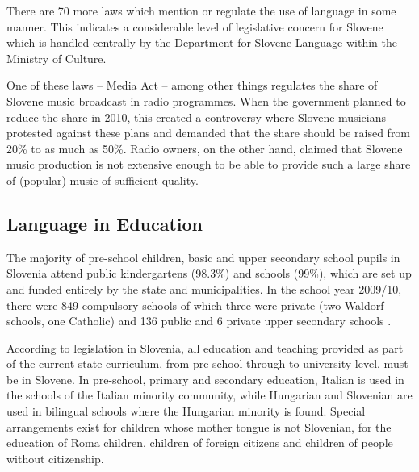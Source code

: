 \begin{multicols}{2}
There are 70 more laws which mention or regulate the use of language in some manner. This indicates a considerable level of legislative concern for Slovene which is handled centrally by the Department for Slovene Language within the Ministry of Culture.

One of these laws – Media Act – among other things regulates the share of Slovene music broadcast in radio programmes. When the government planned to reduce the share in 2010, this created a controversy where Slovene musicians protested against these plans and demanded that the share should be raised from 20\% to as much as 50\%. Radio owners, on the other hand, claimed that Slovene music production is not extensive enough to be able to provide such a large share of (popular) music of sufficient quality.


\subsection{Language in Education}

The majority of pre-school children, basic and upper secondary school pupils in Slovenia attend public kindergartens (98.3\%) and schools (99\%), which are set up and funded entirely by the state and municipalities. In the school year 2009/10, there were 849 compulsory schools of which three were private (two Waldorf schools, one Catholic) and 136 public and 6 private upper secondary schools \cite{Eurydice1}.

According to legislation in Slovenia, all education and teaching provided as part of the current state curriculum, from pre-school through to university level, must be in Slovene. In pre-school, primary and secondary education, Italian is used in the schools of the Italian minority community, while Hungarian and Slovenian are used in bilingual schools where the Hungarian minority is found. Special arrangements exist for children whose mother tongue is not Slovenian, for the education of Roma children, children of foreign citizens and children of people without citizenship.



\end{multicols}
